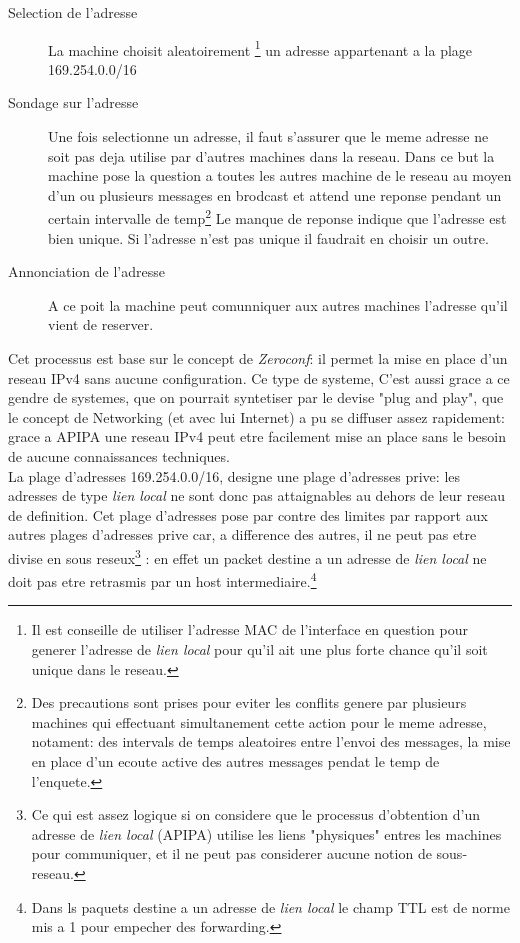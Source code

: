 \begin{description}
\begin{description}
\item[Selection de l'adresse]
La machine choisit aleatoirement
    \footnote{Il est conseille de utiliser l'adresse MAC de l'interface en question
    pour generer l'adresse de {\it lien local} pour qu'il ait une plus forte chance
    qu'il soit unique dans le reseau.} 
un adresse appartenant a la plage 169.254.0.0/16

\item[Sondage sur l'adresse]
Une fois selectionne un adresse, il faut s'assurer que le meme adresse ne soit
pas deja utilise par d'autres machines dans la reseau. Dans ce but la machine
pose la question a toutes les autres machine de le reseau au moyen d'un ou plusieurs messages
en brodcast et attend une reponse pendant un certain intervalle de temp\footnote{
Des precautions sont prises pour eviter les conflits genere par plusieurs
machines qui effectuant simultanement cette action pour le meme adresse,
notament: des intervals de temps aleatoires entre l'envoi des messages, la mise
en place d'un ecoute active des autres messages pendat le temp de l'enquete.}
Le manque de reponse indique que l'adresse est bien unique. Si l'adresse n'est
pas unique il faudrait en choisir un outre.

\item[Annonciation de l'adresse]
A ce poit la machine peut comunniquer aux autres machines l'adresse qu'il
vient de reserver.

\end{description}



Cet processus est base sur le concept de {\it Zeroconf}: il permet la mise en
place d'un reseau IPv4 sans aucune configuration. Ce type de systeme,
C'est aussi grace a ce gendre de systemes, que on 
pourrait syntetiser par le devise %
"plug and play", que le concept de Networking (et avec lui Internet) a pu se
diffuser assez rapidement: grace a APIPA une reseau IPv4 peut etre facilement
mise an place sans le besoin de aucune connaissances techniques.\\

La plage d'adresses 169.254.0.0/16, designe une plage d'adresses prive: les
adresses de type {\it lien local} ne sont donc pas attaignables au dehors de
leur reseau de definition. 
Cet plage d'adresses pose  par contre des limites par rapport aux autres
plages d'adresses prive car, a difference des autres, il ne peut pas etre
divise en sous reseux\footnote{Ce qui est assez logique si on considere que
le processus d'obtention d'un adresse de {\it lien local} (APIPA) utilise
les liens "physiques" entres les machines pour communiquer, et il ne peut
pas considerer aucune notion de sous-reseau.}
: en effet un packet destine a un adresse de {\it lien local} ne doit pas etre
retrasmis par un host intermediaire.\footnote{Dans ls paquets destine
a un adresse de {\it lien local} le champ TTL est de norme mis a 1
pour empecher des forwarding.}


\end{description}
